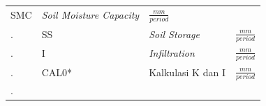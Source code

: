 \documentclass[11pt]{article}
\begin{document}
\begin{longtable}[]{@{}lllc@{}}
\begin{minipage}[t]{0.22\columnwidth}
SMC\strut
\end{minipage} & \begin{minipage}[t]{0.22\columnwidth}\raggedright
\emph{Soil Moisture Capacity}\strut
\end{minipage} & \begin{minipage}[t]{0.22\columnwidth}\centering
\(\frac{mm}{period}\)\strut
\end{minipage}\tabularnewline
\begin{minipage}[t]{0.22\columnwidth}\raggedright
.\strut
\end{minipage} & \begin{minipage}[t]{0.22\columnwidth}\raggedright
SS\strut
\end{minipage} & \begin{minipage}[t]{0.22\columnwidth}\raggedright
\emph{Soil Storage}\strut
\end{minipage} & \begin{minipage}[t]{0.22\columnwidth}\centering
\(\frac{mm}{period}\)\strut
\end{minipage}\tabularnewline
\begin{minipage}[t]{0.22\columnwidth}\raggedright
.\strut
\end{minipage} & \begin{minipage}[t]{0.22\columnwidth}\raggedright
I\strut
\end{minipage} & \begin{minipage}[t]{0.22\columnwidth}\raggedright
\emph{Infiltration}\strut
\end{minipage} & \begin{minipage}[t]{0.22\columnwidth}\centering
\(\frac{mm}{period}\)\strut
\end{minipage}\tabularnewline
\begin{minipage}[t]{0.22\columnwidth}\raggedright
.\strut
\end{minipage} & \begin{minipage}[t]{0.22\columnwidth}\raggedright
CAL0*\strut
\end{minipage} & \begin{minipage}[t]{0.22\columnwidth}\raggedright
Kalkulasi K dan I\strut
\end{minipage} & \begin{minipage}[t]{0.22\columnwidth}\centering
\(\frac{mm}{period}\)\strut
\end{minipage}\tabularnewline
\begin{minipage}[t]{0.22\columnwidth}\raggedright
.\strut
\end{minipage} & \begin{minipage}[t]{0.22\columnwidth}\raggedright

\end{minipage}
\end{longtable}
\end{document}
